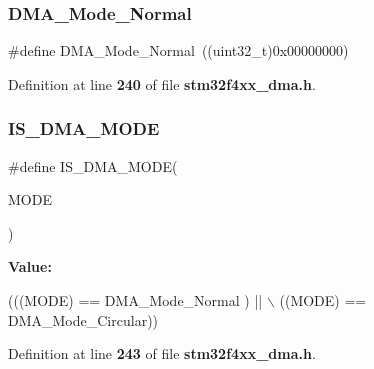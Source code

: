 \subsubsection{D\+M\+A\+\_\+\+Mode\+\_\+\+Normal}
{\footnotesize\ttfamily \#define D\+M\+A\+\_\+\+Mode\+\_\+\+Normal~((uint32\+\_\+t)0x00000000)}



Definition at line \textbf{ 240} of file \textbf{ stm32f4xx\+\_\+dma.\+h}.

\mbox{\label{group__DMA__circular__normal__mode_gad88ee5030574d6a573904378fb62c7ac}} 
\subsubsection{I\+S\+\_\+\+D\+M\+A\+\_\+\+M\+O\+DE}
{\footnotesize\ttfamily \#define I\+S\+\_\+\+D\+M\+A\+\_\+\+M\+O\+DE(\begin{DoxyParamCaption}\item[{}]{M\+O\+DE }\end{DoxyParamCaption})}

{\bfseries Value\+:}
\begin{DoxyCode}
(((MODE) == DMA_Mode_Normal ) || \(\backslash\)
                           ((MODE) == DMA_Mode_Circular))
\end{DoxyCode}


Definition at line \textbf{ 243} of file \textbf{ stm32f4xx\+\_\+dma.\+h}.

